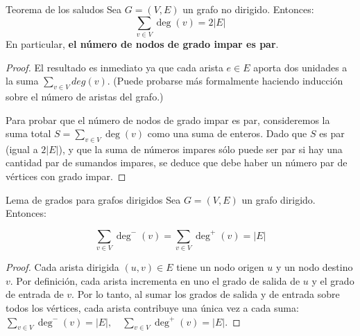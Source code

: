 \begin{thmblock}{Teorema de los saludos}
Sea $G = (V, E)$ un grafo no dirigido. Entonces:
$$
\sum_{v \in V} \deg(v) = 2|E|
$$
En particular, \textbf{el número de nodos de grado impar es par}.
\end{thmblock}

\begin{proof}
El resultado es inmediato ya que cada arista $e \in E$ aporta dos unidades
a la suma $\sum_{v \in V} deg(v)$. (Puede probarse más
formalmente haciendo inducción sobre el número de aristas del grafo.)

\medskip

Para probar que el número de nodos de grado impar es par, consideremos la suma total $S = \sum_{v \in V} \deg(v)$ como una suma de enteros. Dado que $S$ es par (igual a $2|E|$), y que la suma de números impares sólo puede ser par si hay una cantidad par de sumandos impares, se deduce que debe haber un número par de vértices con grado impar.
\end{proof}



\begin{thmblock}{Lema de grados para grafos dirigidos}
Sea $G=(V,E)$ un grafo dirigido. Entonces:

$$
\sum_{v \in V} \deg^{-}(v) = \sum_{v \in V} \deg^{+}(v) = |E|
$$
\end{thmblock}

\begin{proof}
Cada arista dirigida $(u,v) \in E$ tiene un nodo origen $u$ y un nodo destino $v$. Por definición, cada arista incrementa en uno el grado de salida de $u$ y el grado de entrada de $v$. Por lo tanto, al sumar los grados de salida y de entrada sobre todos los vértices, cada arista contribuye una única vez a cada suma:
$\sum_{v \in V} \deg^{-}(v) = |E|, \quad \sum_{v \in V} \deg^{+}(v) = |E|.$
\end{proof}

